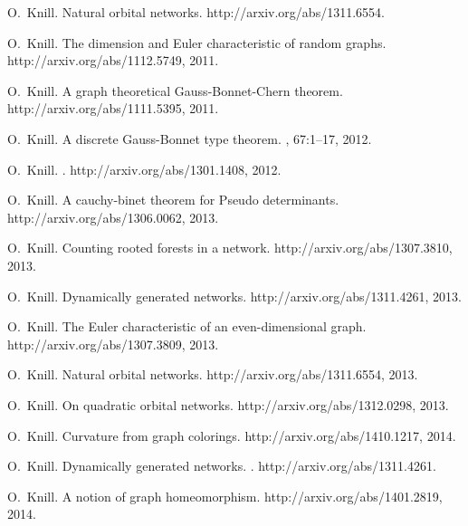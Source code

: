 \documentclass[12pt]{amsart}
\theoremstyle{definition}
\begin{document}
\begin{thebibliography}{10}
O.~Knill.
\newblock Natural orbital networks.
\newblock http://arxiv.org/abs/1311.6554.

O.~Knill.
\newblock The dimension and {Euler} characteristic of random graphs.
\newblock {\\}http://arxiv.org/abs/1112.5749, 2011.

O.~Knill.
\newblock A graph theoretical {Gauss-Bonnet-Chern} theorem.
\newblock {\\}http://arxiv.org/abs/1111.5395, 2011.

O.~Knill.
\newblock A discrete {Gauss-Bonnet} type theorem.
, 67:1--17, 2012.

O.~Knill.
.
\newblock {\\}http://arxiv.org/abs/1301.1408, 2012.

O.~Knill.
\newblock A cauchy-binet theorem for {P}seudo determinants.
\newblock {\\}http://arxiv.org/abs/1306.0062, 2013.

O.~Knill.
\newblock Counting rooted forests in a network.
\newblock http://arxiv.org/abs/1307.3810, 2013.

O.~Knill.
\newblock Dynamically generated networks.
\newblock http://arxiv.org/abs/1311.4261, 2013.

O.~Knill.
\newblock The {E}uler characteristic of an even-dimensional graph.
\newblock http://arxiv.org/abs/1307.3809, 2013.

O.~Knill.
\newblock Natural orbital networks.
\newblock http://arxiv.org/abs/1311.6554, 2013.

O.~Knill.
\newblock On quadratic orbital networks.
\newblock http://arxiv.org/abs/1312.0298, 2013.

O.~Knill.
\newblock Curvature from graph colorings.
\newblock http://arxiv.org/abs/1410.1217, 2014.

O.~Knill.
\newblock Dynamically generated networks.
.
\newblock http://arxiv.org/abs/1311.4261.

O.~Knill.
\newblock A notion of graph homeomorphism.
\newblock http://arxiv.org/abs/1401.2819, 2014.


\end{thebibliography}
\end{document}
